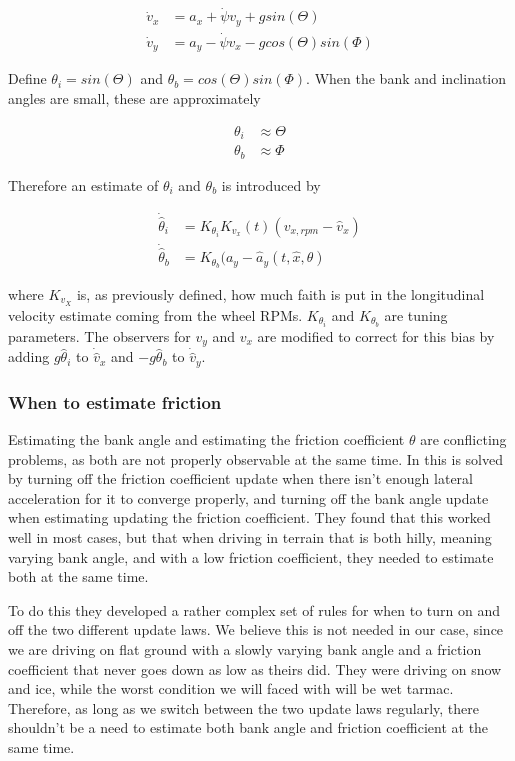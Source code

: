 \begin{align}
    \dot{v}_x & = a_x + \dot{\psi} v_y + g sin(\Theta) \\
    \dot{v}_y & = a_y - \dot{\psi}v_x - g cos(\Theta) sin(\Phi)
\end{align}

Define $\theta_i = sin(\Theta)$ and $\theta_b = cos(\Theta)sin(\Phi)$. When the bank and inclination angles are small, these are approximately 

\begin{align}
    \theta_i & \approx \Theta \\
    \theta_b & \approx \Phi
\end{align}

Therefore an estimate of $\theta_i$ and $\theta_b$ is introduced by

\begin{align}
    \dot{\hat{\theta}}_i & = K_{\theta_i}K_{v_x}(t)(v_{x,rpm} - \hat{v}_x) \\
    \dot{\hat{\theta}}_b & = K_{\theta_b}(a_y-\hat{a}_y(t,\hat{x},\theta)
\end{align}

where $K_{v_X}$ is, as previously defined, how much faith is put in the longitudinal velocity estimate coming from the wheel \glspl{RPM}. $K_{\theta_i}$ and $K_{\theta_b}$ are tuning parameters. The observers for $v_y$ and $v_x$ are modified to correct for this bias by adding $g\hat{\theta}_i$ to $\dot{\hat{v}}_x$ and $-g\hat{\theta}_b$ to $\dot{\hat{v}}_y$. 

\subsubsection{When to estimate friction}

Estimating the bank angle and estimating the friction coefficient $\theta$ are conflicting problems, as both are not properly observable at the same time. In \cite{MainStateEst} this is solved by turning off the friction coefficient update when there isn't enough lateral acceleration for it to converge properly, and turning off the bank angle update when estimating updating the friction coefficient. They found that this worked well in most cases, but that when driving in terrain that is both hilly, meaning varying bank angle, and with a low friction coefficient, they needed to estimate both at the same time. 

To do this they developed a rather complex set of rules for when to turn on and off the two different update laws. We believe this is not needed in our case, since we are driving on flat ground with a slowly varying bank angle and a friction coefficient that never goes down as low as theirs did. They were driving on snow and ice, while the worst condition we will faced with will be wet tarmac. Therefore, as long as we switch between the two update laws regularly, there shouldn't be a need to estimate both bank angle and friction coefficient at the same time. 

